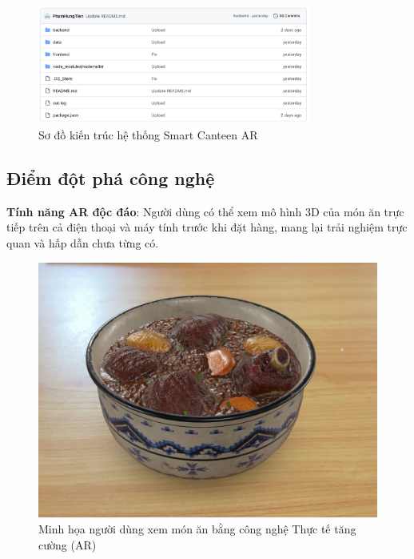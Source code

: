 \documentclass[12pt,a4paper]{article}
\begin{document}
\begin{figure}[H]
    \centering
    \includegraphics[width=0.8\textwidth]{kien_truc_he_thong.png} %
    \caption{Sơ đồ kiến trúc hệ thống Smart Canteen AR}
    \label{fig:kien_truc_he_thong}
\end{figure}

\subsection{Điểm đột phá công nghệ}
\textbf{Tính năng AR độc đáo}: Người dùng có thể xem mô hình 3D của món ăn trực tiếp trên cả điện thoại và máy tính trước khi đặt hàng, mang lại trải nghiệm trực quan và hấp dẫn chưa từng có.

\begin{figure}[H]
    \centering
    \includegraphics[width=\textwidth]{minh_hoa_ar_mon_an.png} %
    \caption{Minh họa người dùng xem món ăn bằng công nghệ Thực tế tăng cường (AR)}
    \label{fig:ar_food_view}
\end{figure}
\end{document}
